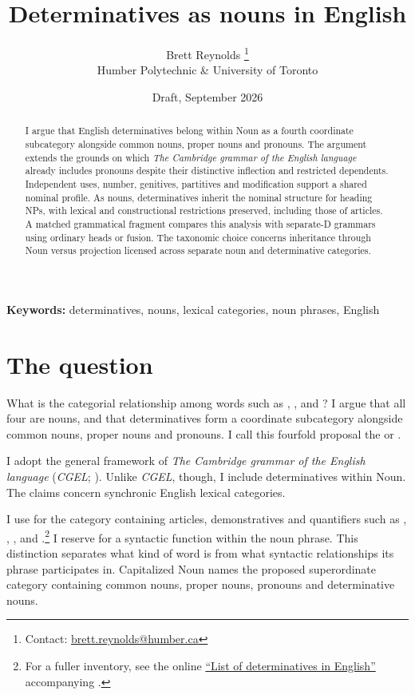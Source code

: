 \documentclass[12pt]{article}
\title{Determinatives as nouns in English}
\author{Brett Reynolds \orcidlink{0000-0003-0073-7195}%
\thanks{Contact: \href{mailto:brett.reynolds@humber.ca}{brett.reynolds@humber.ca}}\\
Humber Polytechnic \& University of Toronto}
\date{Draft, September 2026}
\begin{document}
\maketitle

\begin{abstract}
I argue that English determinatives belong within Noun as a fourth coordinate subcategory alongside common nouns, proper nouns and pronouns. The argument extends the grounds on which \textit{The Cambridge grammar of the English language} already includes pronouns despite their distinctive inflection and restricted dependents. Independent uses, number, genitives, partitives and modification support a shared nominal profile. As nouns, determinatives inherit the nominal structure for heading NPs, with lexical and constructional restrictions preserved, including those of articles. A matched grammatical fragment compares this analysis with separate-D grammars using ordinary heads or fusion. The taxonomic choice concerns inheritance through Noun versus projection licensed across separate noun and determinative categories.
\end{abstract}

\noindent\textbf{Keywords:} determinatives, nouns, lexical categories, noun phrases, English

\section{The question}\label{sec:intro}

What is the categorial relationship among words such as , ,  and ? I argue that all four are nouns, and that determinatives form a coordinate subcategory alongside common nouns, proper nouns and pronouns. I call this fourfold proposal the  or .

I adopt the general framework of \textit{The Cambridge grammar of the English language} (\textit{CGEL}; \citealt{huddleston2002}). Unlike \textit{CGEL}, though, I include determinatives within Noun. The claims concern synchronic English lexical categories.

I use  for the category containing articles, demonstratives and quantifiers such as , , ,  and .\footnote{For a fuller inventory, see the online \href{https://www.cambridge.org/highereducation/api/resources/2AC8DF5CA558F8A6FCDFACD0EAF8EA08}{\enquote{List of determinatives in English}} accompanying \textcite{Huddleston2021}.} I reserve  for a syntactic function within the noun phrase. This distinction separates what kind of word  is from what syntactic relationships its phrase participates in. Capitalized Noun names the proposed superordinate category containing common nouns, proper nouns, pronouns and determinative nouns.
\end{document}
